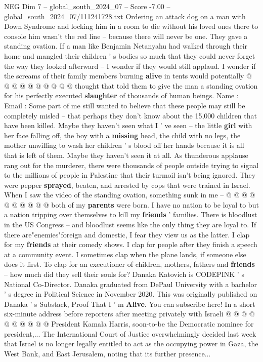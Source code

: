 \begin{textsample}{NEG Dim 7 – global\_south\_2024\_07 – Score -7.00 – global\_south\_2024\_07/111241728.txt}
Ordering an attack dog on a man with Down Syndrome and locking him in a room to die without his loved ones there to console him wasn't the red line -- because there will never be one.
They gave a standing ovation.
If a man like Benjamin Netanyahu had walked through their home and mangled their children ' s bodies so much that they could never forget the way they looked afterward -- I wonder if they would still applaud.
I wonder if the screams of their family members burning \textbf{alive} in tents would potentially @ @ @ @ @ @ @ @ @ @ thought that told them to give the man a standing ovation for his perfectly executed \textbf{slaughter} of thousands of human beings.
Name : Email : Some part of me still wanted to believe that these people may still be completely misled -- that perhaps they don't know about the 15,000 children that have been killed.
Maybe they haven't seen what I ' ve seen -- the little \textbf{girl} with her face falling off, the boy with a \textbf{missing} head, the child with no legs, the mother unwilling to wash her children ' s blood off her hands because it is all that is left of them.
Maybe they haven't seen it at all.
As thunderous applause rang out for the murderer, there were thousands of people outside trying to signal to the millions of people in Palestine that their turmoil isn't being ignored.
They were pepper \textbf{sprayed}, beaten, and arrested by cops that were trained in Israel.
When I saw the video of the standing ovation, something sunk in me -- @ @ @ @ @ @ @ @ @ @ both of my \textbf{parents} were born.
I have no nation to be loyal to but a nation tripping over themselves to kill my \textbf{friends} ' families.
There is bloodlust in the US Congress -- and bloodlust seems like the only thing they are loyal to.
If there are"enemies"foreign and domestic, I fear they view us as the latter.
I clap for my \textbf{friends} at their comedy shows.
I clap for people after they finish a speech at a community event.
I sometimes clap when the plane lands, if someone else does it first.
To clap for an executioner of children, mothers, fathers and \textbf{friends} -- how much did they sell their souls for?
Danaka Katovich is CODEPINK ' s National Co-Director.
Danaka graduated from DePaul University with a bachelor ' s degree in Political Science in November 2020.
This was originally published on Danaka ' s Substack, Proof That I ' m \textbf{Alive}.
You can subscribe here!
In a short six-minute address before reporters after meeting privately with Israeli @ @ @ @ @ @ @ @ @ @ President Kamala Harris, soon-to-be the Democratic nominee for president,...
The International Court of Justice overwhelmingly decided last week that Israel is no longer legally entitled to act as the occupying power in Gaza, the West Bank, and East Jerusalem, noting that its further presence...

\end{textsample}
